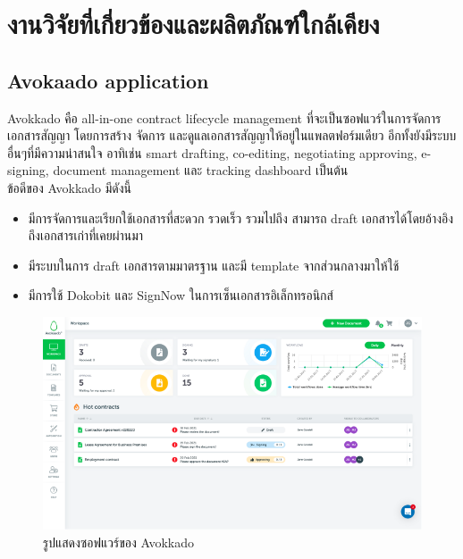 \documentclass[12pt,oneside,openright,a4paper]{cpe-thai-project}
\begin{document}
\section{งานวิจัยที่เกี่ยวข้องและผลิตภัณฑ์ใกล้เคียง}
\subsection{Avokaado application}
\hspace*{1cm} Avokkado คือ all-in-one contract lifecycle management ที่จะเป็นซอฟแวร์ในการจัดการเอกสารสัญญา โดยการสร้าง จัดการ และดูแลเอกสารสัญญาให้อยู่ในแพลตฟอร์มเดียว อีกทั้งยังมีระบบอื่นๆที่มีความน่าสนใจ อาทิเช่น smart drafting, co-editing, negotiating approving, e-signing, document management และ tracking dashboard เป็นต้น \\
\hspace*{1cm} ข้อดีของ Avokkado มีดังนี้
\begin{itemize}
  \item มีการจัดการและเรียกใช้เอกสารที่สะดวก รวดเร็ว รวมไปถึง สามารถ draft เอกสารได้โดยอ้างอิงถึงเอกสารเก่าที่เคยผ่านมา
  \item มีระบบในการ draft เอกสารตามมาตรฐาน และมี template จากส่วนกลางมาให้ใช้
  \item มีการใช้ Dokobit และ SignNow ในการเซ็นเอกสารอิเล็กทรอนิกส์
\end{itemize}

\begin{figure}[!h]\centering
  \includegraphics[width=13cm]{./assets/avokkado.png}
  \caption{รูปแสดงซอฟแวร์ของ Avokkado}\label{fig:avokkado}
\end{figure}

\newpage
\end{document}
